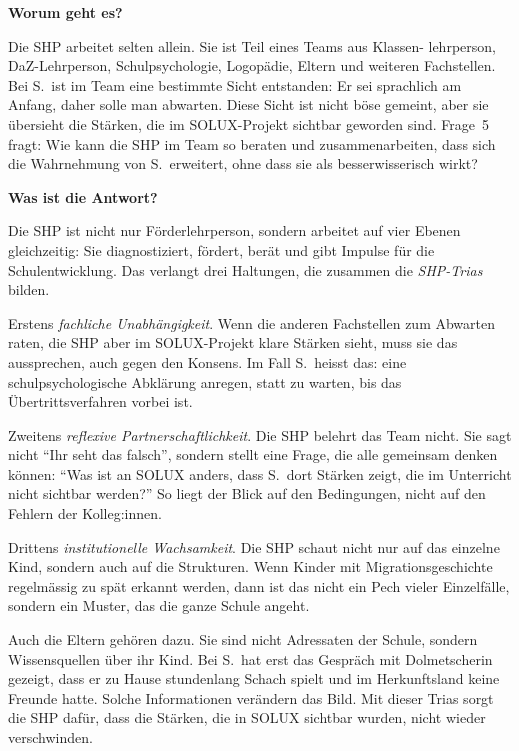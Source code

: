 \documentclass[ngerman, a4paper]{article}
\begin{document}
\begin{frageantwort5}
\textbf{Worum geht es?}

Die SHP arbeitet selten allein. Sie ist Teil eines Teams aus Klassen-
lehrperson, DaZ-Lehrperson, Schulpsychologie, Logopädie, Eltern und
weiteren Fachstellen. Bei S.~ist im Team eine bestimmte Sicht entstanden:
Er sei sprachlich am Anfang, daher solle man abwarten. Diese Sicht ist
nicht böse gemeint, aber sie übersieht die Stärken, die im SOLUX-Projekt
sichtbar geworden sind. Frage~5 fragt: Wie kann die SHP im Team so
beraten und zusammenarbeiten, dass sich die Wahrnehmung von S.~erweitert,
ohne dass sie als besserwisserisch wirkt?

\medskip
\textbf{Was ist die Antwort?}

Die SHP ist nicht nur Förderlehrperson, sondern arbeitet auf vier Ebenen
gleichzeitig: Sie diagnostiziert, fördert, berät und gibt Impulse für
die Schulentwicklung. Das verlangt drei Haltungen, die zusammen die
\emph{SHP-Trias} bilden.

Erstens \emph{fachliche Unabhängigkeit}. Wenn die anderen Fachstellen
zum Abwarten raten, die SHP aber im SOLUX-Projekt klare Stärken sieht,
muss sie das aussprechen, auch gegen den Konsens. Im Fall S.~heisst das:
eine schulpsychologische Abklärung anregen, statt zu warten, bis das
Übertrittsverfahren vorbei ist.

Zweitens \emph{reflexive Partnerschaftlichkeit}. Die SHP belehrt das Team
nicht. Sie sagt nicht \enquote{Ihr seht das falsch}, sondern stellt eine
Frage, die alle gemeinsam denken können: \enquote{Was ist an SOLUX
anders, dass S.~dort Stärken zeigt, die im Unterricht nicht sichtbar
werden?} So liegt der Blick auf den Bedingungen, nicht auf den Fehlern
der Kolleg:innen.

Drittens \emph{institutionelle Wachsamkeit}. Die SHP schaut nicht nur
auf das einzelne Kind, sondern auch auf die Strukturen. Wenn Kinder mit
Migrationsgeschichte regelmässig zu spät erkannt werden, dann ist das
nicht ein Pech vieler Einzelfälle, sondern ein Muster, das die ganze
Schule angeht.

Auch die Eltern gehören dazu. Sie sind nicht Adressaten der Schule,
sondern Wissensquellen über ihr Kind. Bei S.~hat erst das Gespräch mit
Dolmetscherin gezeigt, dass er zu Hause stundenlang Schach spielt und
im Herkunftsland keine Freunde hatte. Solche Informationen verändern
das Bild. Mit dieser Trias sorgt die SHP dafür, dass die Stärken, die
in SOLUX sichtbar wurden, nicht wieder verschwinden.
\end{frageantwort5}
 
\end{document}
